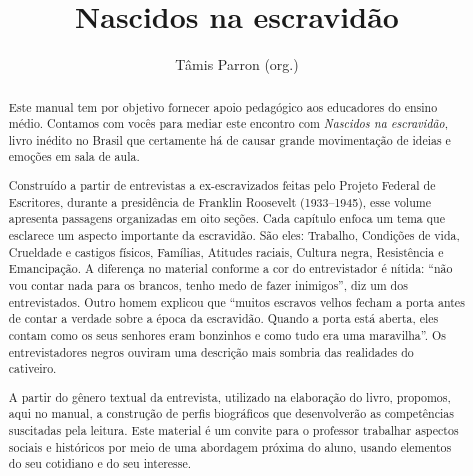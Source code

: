 \documentclass[11pt]{extarticle}
\begin{document}
\newcommand{\AutorLivro}{Tâmis Parron (org.)}
\newcommand{\TituloLivro}{Nascidos na escravidão}
\newcommand{\Tema}{Diálogos com a sociologia e com a antropologia}
\newcommand{\Genero}{Diário; biografia; autobiografia; relatos; memórias}
\newcommand{\imagemCapa}{./images/PNLD0007-01.png}
\newcommand{\issnppub}{---}
\newcommand{\issnepub}{---}
\newcommand{\colaborador}{Eduardo Modesto de Carvalho, Bruno Gradella e Vicente Castro}


\title{\TituloLivro}
\author{\AutorLivro}
\def\authornotes{\colaborador}

\date{}
\maketitle

\begin{abstract}

Este manual tem por objetivo fornecer apoio pedagógico aos educadores
do ensino médio. Contamos com vocês para mediar este encontro com \emph{Nascidos na escravidão}, 
livro inédito no Brasil que certamente há de causar grande movimentação de 
ideias e emoções em sala de aula. 

Construído a partir de entrevistas a ex-escravizados feitas pelo Projeto 
Federal de Escritores, durante a presidência de Franklin Roosevelt (1933--1945), 
esse volume apresenta passagens organizadas em oito seções. Cada capítulo 
enfoca um tema que esclarece um aspecto importante da escravidão. São eles: 
Trabalho, Condições de vida, Crueldade e castigos físicos, Famílias, Atitudes 
raciais, Cultura negra, Resistência e Emancipação. A diferença no material 
conforme a cor do entrevistador é nítida: ``não vou contar nada para os 
brancos, tenho medo de fazer inimigos'', diz um dos entrevistados. Outro homem 
explicou que ``muitos escravos velhos fecham a porta antes de contar a verdade 
sobre a época da escravidão. Quando a porta está aberta, eles contam como os 
seus senhores eram bonzinhos e como tudo era uma maravilha''. Os entrevistadores 
negros ouviram uma descrição mais sombria das realidades do cativeiro.

A partir do gênero textual da entrevista, utilizado na elaboração do 
livro, propomos, aqui no manual, a construção de perfis biográficos 
que desenvolverão as competências suscitadas pela leitura. Este 
material é um convite para o professor trabalhar aspectos sociais 
e históricos por meio de uma abordagem próxima do aluno, usando 
elementos do seu cotidiano e do seu interesse.


\end{abstract}
\end{document}
